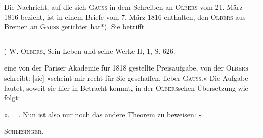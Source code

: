 Die Nachricht, auf die sich \textsc{Gauss} in dem Schreiben an \textsc{Olbers} vom 21. März 1816 bezieht, ist
in einem Briefe vom 7. März 1816 enthalten, den \textsc{Olbers} aus Bremen an \textsc{Gauss} gerichtet hat*). Sie betrifft
\par\vfill\noindent\rule{.25\linewidth}{.4pt}\par\smallskip
\noindent*) W. \textsc{Olbers}, Sein Leben und seine Werke II, 1, S. 626.\par
\clearpage
{}
\noindent eine von der Pariser Akademie für 1818 gestellte Preisaufgabe, von der \textsc{Olbers} schreibt: [sie] »scheint mir
recht für Sie geschaffen, lieber \textsc{Gauss}.« Die Aufgabe lautet, soweit sie hier in Betracht kommt, in der
\textsc{Olbers}schen Übersetzung wie folgt:

».\ .\ . Nun ist also nur noch das andere Theorem zu beweisen: «
\begin{flushright}\textsc{Schlesinger.}\end{flushright}
\ClosingRule\clearpage\endgroup
